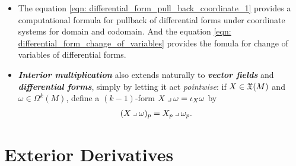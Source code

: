 \documentclass[11pt]{article}
\begin{document}
\begin{itemize}
\item \begin{remark}
The equation \eqref{eqn: differential_form_pull_back_coordinate_1} provides a computational formula for pullback of differential forms under coordinate systems for domain and codomain. And the equation \eqref{eqn: differential_form_change_of_variables} provides the fomula for change of variables of differential forms.
\end{remark}

\item \begin{definition}
\emph{\textbf{Interior multiplication}} also extends naturally to \emph{\textbf{vector fields}} and \emph{\textbf{differential forms}}, simply by letting it act \emph{pointwise}: if $X\in {\mathfrak X}(M)$ and $\omega \in \Omega^k(M)$, define a $(k-1)$-form $X \mathbin{\lrcorner }{\omega} = \iota_{X}\omega$ by
\begin{align*}
(X \mathbin{\lrcorner }{\omega})_p &= X_p \mathbin{\lrcorner }{\omega}_p.
\end{align*}
\end{definition}
\end{itemize}

\section{Exterior Derivatives}
\end{document}
